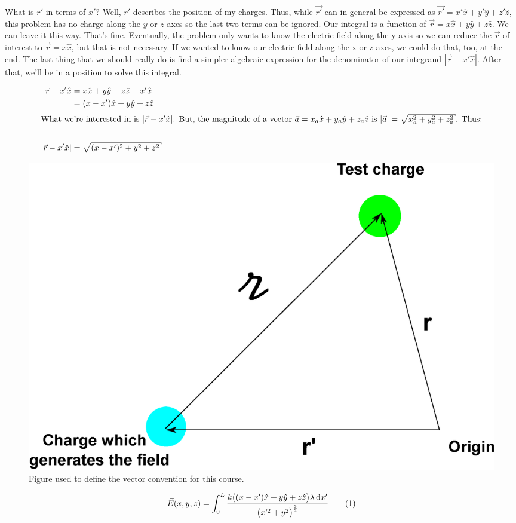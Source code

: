 \begin{homeworkProblem}[Problem 23.42]
 What is $r'$ in terms of $x'$? Well, $r'$ describes the position of my
 charges. Thus, while $\vec{r'}$ can in general be expressed as  $
 \vec{r'} = x' \hat{x} + y'\hat{y} + z'\hat{z}$, this problem has no
 charge along the $y$ or $z$ axes so the last two terms can be ignored.
 Our integral is a function of $\vec{r} = x \hat{x} + y\hat{y} +
 z\hat{z}$. We can leave it this way. That's fine. Eventually, the
 problem only wants to know the electric field along the y axis so we
 can reduce the $\vec{r}$ of interest to $\vec{r} = x\hat{x}$, but that
 is not necessary. If we wanted to know our electric field along the x
 or z axes, we could do that, too, at the end. The last thing that we
 should really do is find a simpler algebraic expression for the
 denominator of our integrand $|\vec{r}-x'\hat{x}|$. After that, we'll
 be in a position to solve this integral. 

\begin{align} 
    \vec{r} - x'\hat{x} &= x\hat{x} + y\hat{y} + z\hat{z} -
    x'\hat{x} \nonumber \\ &= (x - x')\hat{x} + y\hat{y} + z\hat{z}
    \nonumber \\
    \intertext{What we're interested in is $|\vec{r} -
    x'\hat{x}|$. But, the magnitude of a vector $\vec{a} = x_a \hat{x} +
    y_a \hat{y} + z_a \hat{z}$ is $|\vec{a}| = \sqrt{x^2_a + y^2_a +
    z^2_a}$. Thus:} \nonumber \\
    |\vec{r} - x'\hat{x}| &= \sqrt{(x-x')^2 + y^2 + z^2} \nonumber
\end{align}

\begin{figure}
    \centering
    \includegraphics[width=.55\columnwidth]{vecs.eps} 
    \caption{Figure used to define the vector convention for this course.}
    \label{fig:vecs.eps}
\end{figure}

\[ \vec{E}(x,y,z) = \int_0^L \frac{k
\big((x-x')\hat{x}+y\hat{y}+z\hat{z}\big) \lambda \diff x'}{\big( x'^2 +
y^2\big)^\frac{3}{2}} \addtag \]


\end{homeworkProblem}
